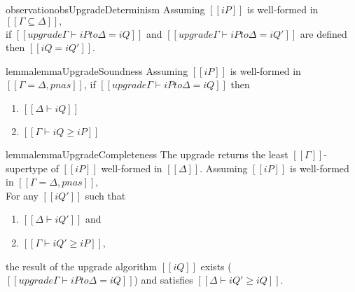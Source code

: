 \begin{restatable}{observation}{obsUpgradeDeterminism}
    \label{obs:upgrade-deterministic}
    Assuming $[[iP]]$ is well-formed in $[[Γ ⊆ Δ]],$\\
    if $[[upgrade Γ ⊢ iP to Δ = iQ]]$ and $[[upgrade Γ ⊢ iP to Δ = iQ']]$ are defined 
    then $[[iQ = iQ']]$.
\end{restatable}

\begin{restatable}{lemma}{lemmaUpgradeSoundness}
    \label{lemma:upgrade-soundness}
    Assuming $[[iP]]$ is well-formed in $[[Γ = Δ, pnas]]$,
    if $[[upgrade Γ ⊢ iP to Δ = iQ]]$
    then
    \begin{enumerate}
        \item $[[Δ ⊢ iQ]]$
        \item $[[Γ ⊢ iQ ≥ iP]]$
    \end{enumerate}
\end{restatable}

\begin{restatable}{lemma}{lemmaUpgradeCompleteness}
    \label{lemma:upgrade-completeness}
    The upgrade returns the least $[[Γ]]$-supertype of $[[iP]]$ well-formed in $[[Δ]]$.
    Assuming $[[iP]]$ is well-formed in $[[Γ = Δ, pnas]],$\\
    For any $[[iQ']]$ such that 
    \begin{enumerate}
        \item $[[Δ ⊢ iQ']]$ and
        \item $[[Γ ⊢ iQ' ≥ iP]]$,
    \end{enumerate}
    the result of the upgrade algorithm $[[iQ]]$ exists
    ($[[upgrade Γ ⊢ iP to Δ = iQ]]$) and satisfies $[[Δ ⊢ iQ' ≥ iQ]]$.
\end{restatable}

